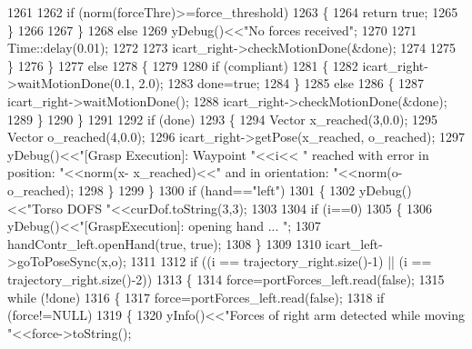 \begin{DoxyCode}
1261 
1262                     \textcolor{keywordflow}{if} (norm(forceThre)>=force\_threshold)
1263                     \{
1264                          \textcolor{keywordflow}{return} \textcolor{keyword}{true};
1265                     \}
1266                     
1267                 \}
1268                 \textcolor{keywordflow}{else}
1269                     yDebug()<<\textcolor{stringliteral}{"No forces received"};
1270 
1271                 Time::delay(0.01);
1272 
1273                 icart\_right->checkMotionDone(&done);
1274                 
1275             \}
1276         \}
1277         \textcolor{keywordflow}{else}
1278         \{
1279 
1280             \textcolor{keywordflow}{if} (compliant)
1281             \{
1282                 icart\_right->waitMotionDone(0.1, 2.0);
1283                 done=\textcolor{keyword}{true};
1284             \}
1285             \textcolor{keywordflow}{else}
1286             \{
1287                 icart\_right->waitMotionDone();
1288                 icart\_right->checkMotionDone(&done);
1289             \}
1290         \}
1291 
1292         \textcolor{keywordflow}{if} (done)
1293         \{
1294              Vector x\_reached(3,0.0);
1295              Vector o\_reached(4,0.0);
1296              icart\_right->getPose(x\_reached, o\_reached);
1297              yDebug()<<\textcolor{stringliteral}{"[Grasp Execution]: Waypoint "}<<i<< \textcolor{stringliteral}{" reached with error in position: "}<<norm(x-
      x\_reached)<<\textcolor{stringliteral}{" and in orientation: "}<<norm(o-o\_reached);
1298         \}
1299     \}
1300     \textcolor{keywordflow}{if} (hand==\textcolor{stringliteral}{"left"})
1301     \{
1302         yDebug()<<\textcolor{stringliteral}{"Torso DOFS "}<<curDof.toString(3,3);
1303 
1304         \textcolor{keywordflow}{if} (i==0)
1305         \{
1306             yDebug()<<\textcolor{stringliteral}{"[GraspExecution]: opening hand ... "};
1307             handContr\_left.openHand(\textcolor{keyword}{true}, \textcolor{keyword}{true});
1308         \}
1309 
1310         icart\_left->goToPoseSync(x,o);
1311 
1312         \textcolor{keywordflow}{if} ((i == trajectory\_right.size()-1) || (i == trajectory\_right.size()-2))
1313         \{
1314             force=portForces\_left.read(\textcolor{keyword}{false});
1315             \textcolor{keywordflow}{while} (!done)
1316             \{
1317                 force=portForces\_left.read(\textcolor{keyword}{false});
1318                 \textcolor{keywordflow}{if} (force!=NULL)
1319                 \{ 
1320                     yInfo()<<\textcolor{stringliteral}{"Forces of right arm detected while moving     "}<<force->toString();

\end{DoxyCode}
